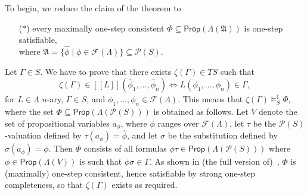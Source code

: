 \documentclass[proceedings]{stacs}
\theoremstyle{definition}
\theoremstyle{plain}
\newcommand{\Pow}{\mathcal{P}}
\newcommand{\Sem}[1]{{[\![#1]\!]}}
\newcommand{\FLang}{\mathcal{F}}
\newcommand{\Prop}{\mathsf{Prop}}
\newcommand{\FA}{\mathfrak{A}}
\begin{document}
To begin, we reduce the claim of the theorem to
  \begin{itemize}
  \item[($*$)] every maximally one-step consistent
    $\Phi\subseteq\Prop(\Lambda(\FA))$ is one-step satisfiable,\\ where
    $\FA=\{\hat\phi\mid\phi\in\FLang(\Lambda)\}\subseteq\Pow(S)$.
  \end{itemize}
  Let $\Gamma\in S$. We have to prove that there exists
  $\zeta(\Gamma)\in TS$ such that 
  \begin{equation*}
    \zeta(\Gamma)\in \Sem{L}(\hat\phi_1,\dots,\hat\phi_n) \iff 
    L(\phi_1,\dots,\phi_n)\in \Gamma,
  \end{equation*}
  for $L\in\Lambda$ $n$-ary, $\Gamma\in S$, and
  $\phi_1,\dots,\phi_n\in\FLang(\Lambda)$. This means that
  $\zeta(\Gamma)\models^1_S\Phi$, where the set
  $\Phi\subseteq\Prop(\Lambda(\Pow(S)))$ is obtained as follows. Let
  $V$ denote the set of propositional variables $a_\phi$, where $\phi$
  ranges over $\FLang(\Lambda)$, let $\tau$ be the $\Pow(S)$-valuation
  defined by $\tau(a_\phi)=\hat\phi$, and let $\sigma$ be the
  substitution defined by $\sigma(a_\phi)=\phi$. Then $\Phi$ consists
  of all formulas $\phi\tau\in\Prop(\Lambda(\Pow(S)))$ where
  $\phi\in\Prop(\Lambda(V))$ is such that $\phi\sigma\in\Gamma$. As
  shown in (the full version of)~\cite{SchroderPattinson07mcs},
  $\Phi$ is (maximally) one-step consistent, hence satisfiable by
  strong one-step completeness, so that $\zeta(\Gamma)$ exists as
  required.
\end{document}
